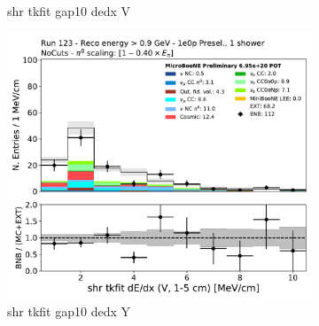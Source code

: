 \begin{figure}[H]
\begin{subfigure}{0.3\textwidth}
    \caption{shr tkfit gap10 dedx V}
    \end{subfigure}
    \begin{subfigure}{0.3\textwidth}
    \includegraphics[width=1.0\textwidth]{1e0p/High_E_Sideband/shr_tkfit_gap10_dedx_V.pdf}
    \caption{shr tkfit gap10 dedx Y}
    \end{subfigure}
    \caption{} 
    \label{fig:HE_1eNp_1}
\end{figure}

